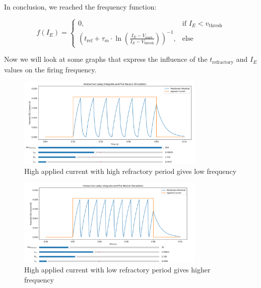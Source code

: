 In conclusion, we reached the frequency function:

\begin{equation}
f(I_E) = \begin{cases}
    0, & \text{if } I_E < v_{\text{thresh}} \\
    \left(t_{\text{ref}} + \tau_m \cdot \ln\left(\frac{I_E - V_{\text{reset}}}{I_E - V_{\text{thresh}}}\right)\right)^{-1}, & \text{else}
\end{cases}
\end{equation}

Now we will look at some graphs that express the influence of the \( t_{\text{refractory}} \) and \( I_E \) values on the firing frequency.

\begin{figure}[H]
    \centering
    \includegraphics[width=0.8\textwidth]{scientific-background/computational-models/LIF/graphs/LIF-heaviside-high-ref.png}
    \caption{High applied current with high refractory period gives low frequency}
    \label{fig:LIF-heaviside-high-ref}
\end{figure}

\begin{figure}[H]
    \centering
    \includegraphics[width=0.8\textwidth]{scientific-background/computational-models/LIF/graphs/LIF-heaviside-low-ref.png}
    \caption{High applied current with low refractory period gives higher frequency}
    \label{fig:LIF-heaviside-low-ref}
\end{figure}

